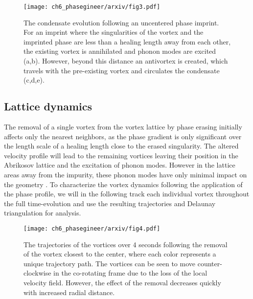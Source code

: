 \begin{figure}[h!]\centering
    \texttt{[image: ch6\_phasegineer/arxiv/fig3.pdf]}
    \caption{The condensate evolution following an uncentered phase imprint. For an imprint where the singularities of the vortex and the imprinted phase are less than a healing length away from each other, the existing vortex is annihilated and phonon modes are excited (a,b). However, beyond this distance an antivortex is created, which travels with the pre-existing vortex and circulates the condensate (c,d,e).}\label{fig:annihilation_1vtx_uncentred}
\end{figure}


\subsection{Lattice dynamics}


The removal of a single vortex from the vortex lattice by phase erasing initially affects only the nearest neighbors, as the phase gradient is only significant over the length scale of a healing length close to the erased singularity. The altered velocity profile will lead to the remaining vortices leaving their position in the Abrikosov lattice and the excitation of phonon modes. However in the lattice areas away from the impurity, these phonon modes have only minimal impact on the geometry \cite{VTX:oriordan_pra_2016}. To characterize the vortex dynamics following the application of the phase profile, we will in the following track each individual vortex throughout the full time-evolution and use the resulting trajectories and Delaunay triangulation for analysis.

\begin{figure}[h!]\centering
\texttt{[image: ch6\_phasegineer/arxiv/fig4.pdf]}
    \caption{The trajectories of the vortices over 4 seconds following the removal of the vortex closest to the center, where each color represents a unique trajectory path. The vortices can be seen to move counter-clockwise in the co-rotating frame due to the loss of the local velocity field. However, the effect of the removal decreases quickly with increased radial distance. }
    \label{fig:trajplot}
\end{figure}

